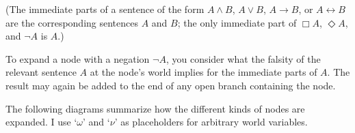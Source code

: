 (The immediate parts of a sentence of the form $A\land B$, $A \lor B$,
$A \to B$, or $A \leftrightarrow B$ are the corresponding sentences $A$ and $B$;
the only immediate part of $\Box A$, $\Diamond A$, and $\neg A$ is $A$.)

To expand a node with a negation $\neg A$, you consider what the falsity of the
relevant sentence $A$ at the node's world implies for the immediate parts of
$A$. The result may again be added to the end of any open branch containing the
node.

The following diagrams summarize how the different kinds of nodes are expanded.
I use `$\omega$' and `$\nu$' as placeholders for arbitrary world variables.


\bigskip

\begin{minipage}{0.33\textwidth}\centering
{}
\end{minipage}
\begin{minipage}{0.33\textwidth}\centering
{}
\end{minipage}
\begin{minipage}{0.33\textwidth}\centering
{}
\end{minipage}

\vspace{10mm}

